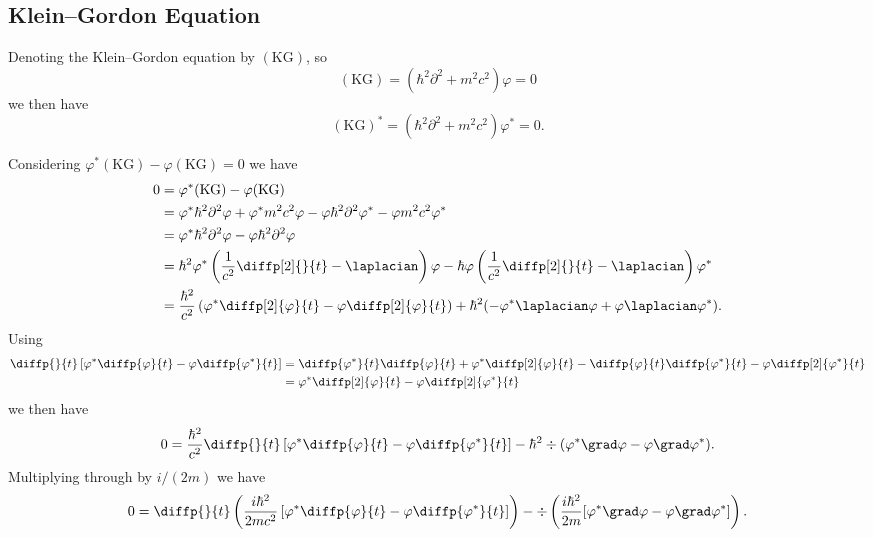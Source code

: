 \documentclass[fleqn]{NotesClass}
\newcommand*{\dalembertian}{\partial^2}
\begin{document}
    \subsection{Klein--Gordon Equation}
    Denoting the Klein--Gordon equation by \((\mathrm{KG})\), so
    \begin{equation}
        (\mathrm{KG}) = (\hbar^2\dalembertian + m^2c^2)\varphi = 0
    \end{equation}
    we then have
    \begin{equation}
        (\mathrm{KG})^* = (\hbar^2\dalembertian + m^2c^2)\varphi^* = 0.
    \end{equation}
    
    Considering \(\varphi^*(\mathrm{KG}) - \varphi(\mathrm{KG}) = 0\) we have
    \begin{align}
        0 &= \varphi^*(\mathrm{KG}) - \varphi(\mathrm{KG})\\
        &= \varphi^*\hbar^2\dalembertian\varphi + \varphi^*m^2c^2\varphi - \varphi\hbar^2\dalembertian\varphi^* - \varphi m^2c^2\varphi^*\\
        &= \varphi^*\hbar^2\dalembertian\varphi - \varphi\hbar^2\dalembertian\varphi\\
        &= \hbar^2\varphi^*\left( \frac{1}{c^2}\diffp[2]{}{t} - \laplacian \right)\varphi - \hbar\varphi\left( \frac{1}{c^2}\diffp[2]{}{t} - \laplacian \right)\varphi^*\\
        &= \frac{\hbar^2}{c^2}\left( \varphi^*\diffp[2]{\varphi}{t} - \varphi\diffp[2]{\varphi}{t} \right) + \hbar^2(-\varphi^*\laplacian\varphi + \varphi\laplacian\varphi^*).
    \end{align}
    Using
    \begin{align}
        \diffp{}{t} \left[ \varphi^*\diffp{\varphi}{t} - \varphi\diffp{\varphi^*}{t} \right] &= \diffp{\varphi^*}{t}\diffp{\varphi}{t} + \varphi^*\diffp[2]{\varphi}{t} - \diffp{\varphi}{t}\diffp{\varphi^*}{t} - \varphi\diffp[2]{\varphi^*}{t}\\
        &= \varphi^*\diffp[2]{\varphi}{t} - \varphi\diffp[2]{\varphi^*}{t}
    \end{align}
    we then have
    \begin{equation}
        0 = \frac{\hbar^2}{c^2} \diffp{}{t}\left[ \varphi^*\diffp{\varphi}{t} - \varphi\diffp{\varphi^*}{t} \right] - \hbar^2 \div(\varphi^*\grad\varphi - \varphi\grad\varphi^*).
    \end{equation}
    Multiplying through by \(i/(2m)\) we have
    \begin{equation}
        0 = \diffp{}{t}\left( \frac{i\hbar^2}{2mc^2} \left[ \varphi^*\diffp{\varphi}{t} - \varphi\diffp{\varphi^*}{t} \right] \right) - \div \left( \frac{i\hbar^2}{2m} [\varphi^*\grad\varphi - \varphi\grad\varphi^*] \right).
    \end{equation}
\end{document}
